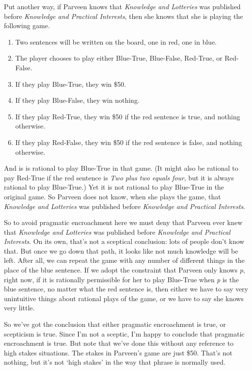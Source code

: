 Put another way, if Parveen knows that \emph{Knowledge and Lotteries} was published before \emph{Knowledge and Practical Interests}, then she knows that she is playing the following game.

\begin{enumerate}
\item Two sentences will be written on the board, one in red, one in blue.

\item The player chooses to play either Blue-True, Blue-False, Red-True, or Red-False.

\item If they play Blue-True, they win \$50.

\item If they play Blue-False, they win nothing.

\item If they play Red-True, they win \$50 if the red sentence is true, and nothing otherwise.

\item If they play Red-False, they win \$50 if the red sentence is false, and nothing otherwise.

\end{enumerate}
And is is rational to play Blue-True in that game. (It might also be rational to pay Red-True if the red sentence is \emph{Two plus two equals four}, but it is always rational to play Blue-True.) Yet it is not rational to play Blue-True in the original game. So Parveen does not know, when she plays the game, that \emph{Knowledge and Lotteries} was published before \emph{Knowledge and Practical Interests}.

So to avoid pragmatic encroachment here we must deny that Parveen ever knew that \emph{Knowledge and Lotteries} was published before \emph{Knowledge and Practical Interests}. On its own, that's not a sceptical conclusion: lots of people don't know that. But once we go down that path, it looks like not much knowledge will be left. After all, we can repeat the game with any number of different things in the place of the blue sentence. If we adopt the constraint that Parveen only knows \emph{p}, right now, if it is rationally permissible for her to play Blue-True when \emph{p} is the blue sentence, no matter what the red sentence is, then either we have to say very unintuitive things about rational plays of the game, or we have to say she knows very little.

So we've got the conclusion that either pragmatic encroachment is true, or scepticism is true. Since I'm not a sceptic, I'm happy to conclude that pragmatic encroachment is true. But note that we've done this without any reference to high stakes situations. The stakes in Parveen's game are just \$50. That's not nothing, but it's not `high stakes' in the way that phrase is normally used. 

